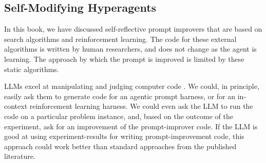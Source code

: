 


\subsection{Self-Modifying Hyperagents}
In this book, we have discussed self-reflective prompt improvers that are based on search algorithms and  reinforcement learning. The code for these external algorithms is written by human researchers, and does not change as the agent is learning. The approach by which the prompt is improved is limited by these static algorithms.

LLMs excel at manipulating and judging computer code \citep{zhuge2024agent}. We could, in principle, easily ask them to generate code for an agentic prompt harness, or for an in-context reinforcement learning harness. We could even ask the LLM to run the code on a particular problem instance, and, based on the outcome of the experiment, ask for an improvement of the prompt-improver code.
If the LLM is good at using experiment-results for writing prompt-improvement code, this approach could work better than  standard approaches from the published literature.

